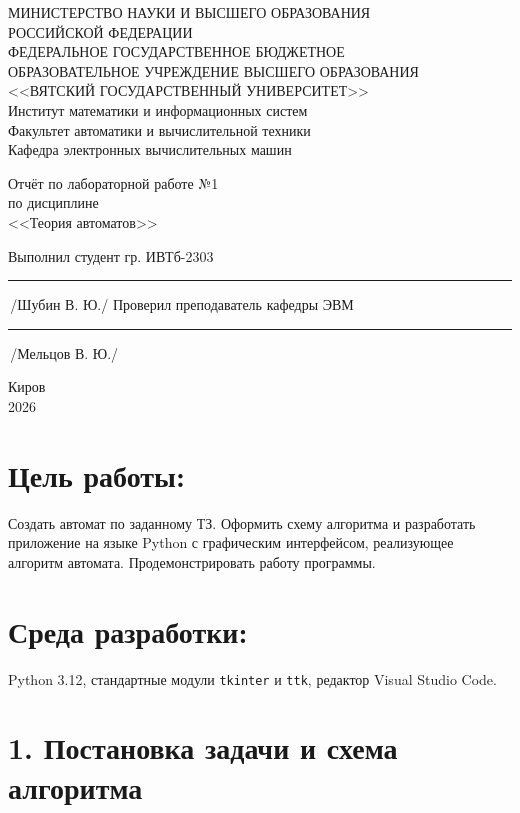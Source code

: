 \documentclass[oneside,a4paper,14pt]{extarticle}
\begin{document}
	\sloppy
	\newpage\thispagestyle{empty}
	\begin{center}
		МИНИСТЕРСТВО НАУКИ И ВЫСШЕГО ОБРАЗОВАНИЯ\\
		РОССИЙСКОЙ ФЕДЕРАЦИИ\\
		ФЕДЕРАЛЬНОЕ ГОСУДАРСТВЕННОЕ БЮДЖЕТНОЕ\\
		ОБРАЗОВАТЕЛЬНОЕ УЧРЕЖДЕНИЕ ВЫСШЕГО ОБРАЗОВАНИЯ\\
		<<ВЯТСКИЙ ГОСУДАРСТВЕННЫЙ УНИВЕРСИТЕТ>>\\
		Институт математики и информационных систем\\
		Факультет автоматики и вычислительной техники\\
		Кафедра электронных вычислительных машин
	\end{center}
	\vspace{20mm}
	\begin{center}
		Отчёт по лабораторной работе №1\\
		по дисциплине\\
		<<Теория автоматов>>
	\end{center}
	\vspace{40mm}
	\noindent
	Выполнил студент гр. ИВТб-2303 \hfill \rule[-0,5mm]{30mm}{0.15mm}\,/Шубин В. Ю./
	\newline
	Проверил преподаватель кафедры ЭВМ \hfill \rule[-0,5mm]{30mm}{0.15mm}\,/Мельцов В. Ю./
	\vfill
	\begin{center}
		Киров\\
		2026
	\end{center}
	\newpage
	\thispagestyle{empty}
	\section*{Цель работы:} Создать автомат по заданному ТЗ. Оформить схему алгоритма и разработать приложение на языке Python с графическим интерфейсом, реализующее алгоритм автомата. Продемонстрировать работу программы.

	\section*{Среда разработки:} Python 3.12, стандартные модули \texttt{tkinter} и \texttt{ttk}, редактор Visual Studio Code.

	\newpage
	
	\section*{1. Постановка задачи и схема алгоритма}
	
\end{document}
